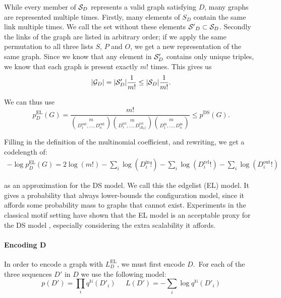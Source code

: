 \documentclass[runningheads]{style/llncs}
\newcommand{\N}{{\mathbb N}}
\newcommand{\G}{{\cal G}}
\begin{document}
While every member of ${\cal S}_D$ represents a valid graph satisfying $D$, many graphs are represented multiple times. Firstly, many elements of ${S}_D$ contain the same link multiple times. We call the set without these elements ${\cal S'}_D \subset {\cal S}_D$. Secondly the links of the graph are listed in arbitrary order; if we apply the same permutation to all three lists $S$, $P$ and $O$, we get a new representation of the same graph. Since we know that any element in ${\cal S}'_D$ contains only unique triples, we know that each graph is present exactly $m!$ times. This gives us
\[
|\G_D| = |{\cal S}'_D| \frac{1}{m!} \leq  |{\cal S}_D| \frac{1}{m!} \text{.}
\]

We can thus use 
\[
p^\text{EL}_D(G) =  \frac{m!}{{m \choose {D_1^\text{out}, \ldots, D_n^\text{out}} }
 {m \choose {D_1^\text{rel}, \ldots, D_{|R_G|}^\text{rel}} }
 {m \choose {D_1^\text{in}, \ldots, D_n^\text{in}} }} \leq p^\text{DS}(G) \text{.}
\]

Filling in the definition of the multinomial coefficient, and rewriting, we get a codelength of:
\begin{align*}
- \log p^\text{EL}_D(G) = 2 \log(m!)
- \sum_i \log(D_i^\text{in}!)- \sum_i \log(D_i^\text{rel}!)- \sum_i \log(D_i^\text{out}!)
\end{align*}

as an approximation for the DS model. We call this the edgelist (EL) model. It gives a probability that always lower-bounds the configuration model, since it affords some probability mass to graphs that cannot exist. Experiments in the classical motif setting have shown that the EL model is an acceptable proxy for the DS model \cite{bloem2017large}, especially considering the extra scalability it affords.

% 
 \paragraph{Encoding D} In order to encode a graph with $L^\text{EL}_D$, we must first encode $D$.\footnotemark~For each of the three sequences $D'$ in $D$ we use the following model:
\[
 p(D') = \prod_i q^{\N}(D'_i)\;\;\;\;\;
 L(D') = - \sum_i \log q^{\N}(D'_i)
\]

\end{document}
